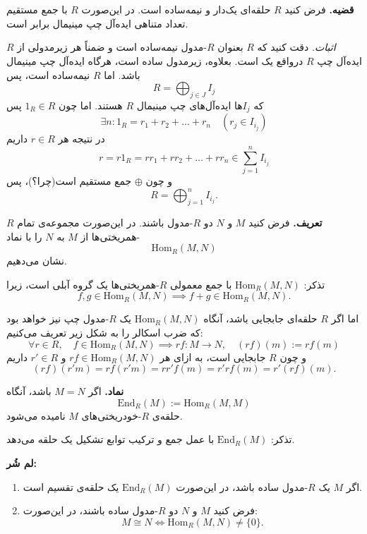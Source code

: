 \section{}




\textbf{قضیه.} فرض کنید \( R \) حلقه‌ای یک‌دار و نیمه‌ساده است. در این‌صورت \( R \) با جمع مستقیم تعداد متناهی ایده‌آل چپ مینیمال برابر است.

\textit{اثبات.} دقت کنید که \( R \) بعنوان \( R \)-مدول نیمه‌ساده است و ضمناً هر زیرمدولی از \( R \) ایده‌آل چپ
\( R \)
درواقع یک
است.
بعلاوه، زیرمدول ساده است، هرگاه ایده‌آل چپ مینیمال باشد.
اما
\( R \) نیمه‌ساده‌ است، پس
\[
    R = \bigoplus_{j \in J} I_j
\]
که \( I_j \)ها ایده‌آل‌های چپ مینیمال \( R \) هستند. اما چون \( 1_R \in R \) پس
\[
    \exists n : 1_R = r_1 + r_2 + \dots + r_n \quad (r_j \in I_{i_j})
\]
در نتیجه هر \( r \in R \) داریم
\[
    r = r 1_R = r r_1 + r r_2 + \dots + r r_n \in \sum_{j=1}^n I_{i_j}
\]
و چون \( \oplus \) جمع مستقیم است(چرا؟)، پس
\[
    R = \bigoplus_{j=1}^n I_{i_j}.
\]

\hrulefill

\textbf{تعریف.}
فرض کنید \( M \) و \( N \) دو \( R \)-مدول باشند. در این‌صورت مجموعه‌ی تمام \( R \)-همریختی‌ها از \( M \) به \( N \) را با نماد
\[
    \mathrm{Hom}_R(M,N)
\]
نشان می‌دهیم.

تذکر: \( \mathrm{Hom}_R(M,N) \) با جمع معمولی \( R \)-همریختی‌ها یک گروه آبلی است، زیرا
\[
    f,g \in \mathrm{Hom}_R(M,N) \implies f+g \in \mathrm{Hom}_R(M,N).
\]

\hrulefill

اما اگر \( R \) حلقه‌ای جابجایی باشد، آنگاه \( \mathrm{Hom}_R(M,N) \) یک \( R \)-مدول چپ نیز خواهد بود که ضرب اسکالر را به شکل زیر تعریف می‌کنیم:
\[
    \forall r \in R, \quad f \in \mathrm{Hom}_R(M,N) \implies rf:M\to N, \quad(rf)(m) := r f(m)
\]
و چون \( R \) جابجایی است، به ازای هر
\(rf \in \mathrm{Hom}_R(M,N)\)
و
\(r' \in R\)
داریم
\[
    (rf)(r'm) = r f(r'm) = r r' f(m) = r' r f(m) = r'(rf)(m).
\]

\hrulefill

\textbf{نماد.} اگر \( M = N \) باشد، آنگاه
\[
    \mathrm{End}_R(M) := \mathrm{Hom}_R(M,M)
\]
حلقه‌ی \( R \)-خودریختی‌های \( M \) نامیده می‌شود.

تذکر: \( \mathrm{End}_R(M) \) با عمل جمع و ترکیب توابع تشکیل یک حلقه‌  می‌دهد.

\hrulefill

\textbf{لم شُر:}
\begin{enumerate}
    \item اگر \( M \) یک \( R \)-مدول ساده باشد، در این‌صورت \( \mathrm{End}_R(M) \) یک حلقه‌ی تقسیم است.
    \item فرض کنید \( M \) و \( N \) دو \( R \)-مدول ساده باشند، در این‌صورت:
          \[
              M \cong N \iff \mathrm{Hom}_R(M,N) \neq \{0\}.
          \]
\end{enumerate}




